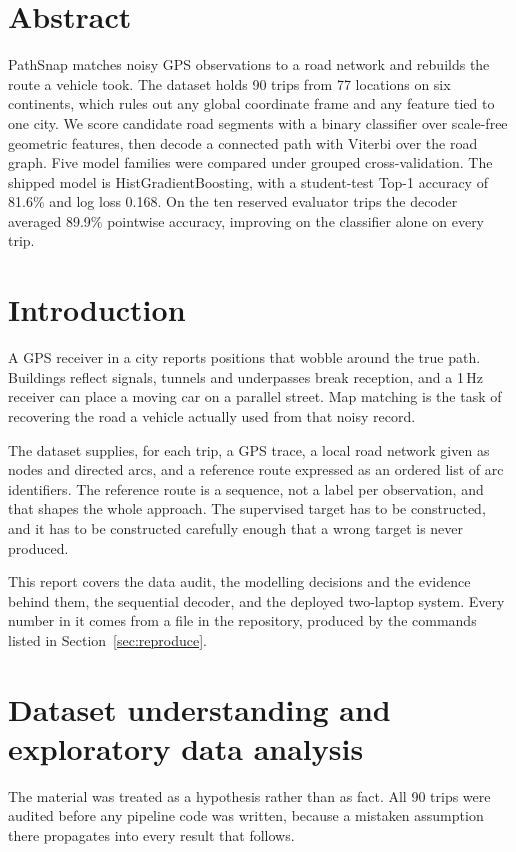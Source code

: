 \documentclass[11pt,a4paper]{article}
\begin{document}
\section*{Abstract}
PathSnap matches noisy GPS observations to a road network and rebuilds the route a vehicle took. The dataset holds 90 trips from 77 locations on six continents, which rules out any global coordinate frame and any feature tied to one city. We score candidate road segments with a binary classifier over scale-free geometric features, then decode a connected path with Viterbi over the road graph. Five model families were compared under grouped cross-validation. The shipped model is HistGradientBoosting, with a student-test Top-1 accuracy of 81.6\% and log loss 0.168. On the ten reserved evaluator trips the decoder averaged 89.9\% pointwise accuracy, improving on the classifier alone on every trip.

\clearpage
\tableofcontents
\clearpage

\section{Introduction}

A GPS receiver in a city reports positions that wobble around the true path. Buildings reflect
signals, tunnels and underpasses break reception, and a 1\,Hz receiver can place a moving car on a
parallel street. Map matching is the task of recovering the road a vehicle actually used from that
noisy record.

The dataset supplies, for each trip, a GPS trace, a local road network given as nodes and directed
arcs, and a reference route expressed as an ordered list of arc identifiers. The reference route is
a sequence, not a label per observation, and that shapes the whole approach. The supervised target
has to be constructed, and it has to be constructed carefully enough that a wrong target is never
produced.

This report covers the data audit, the modelling decisions and the evidence behind them, the
sequential decoder, and the deployed two-laptop system. Every number in it comes from a file in the
repository, produced by the commands listed in Section~\ref{sec:reproduce}.

\section{Dataset understanding and exploratory data analysis}

The material was treated as a hypothesis rather than as fact. All 90 trips were audited before any
pipeline code was written, because a mistaken assumption there propagates into every result that
follows.
\end{document}
